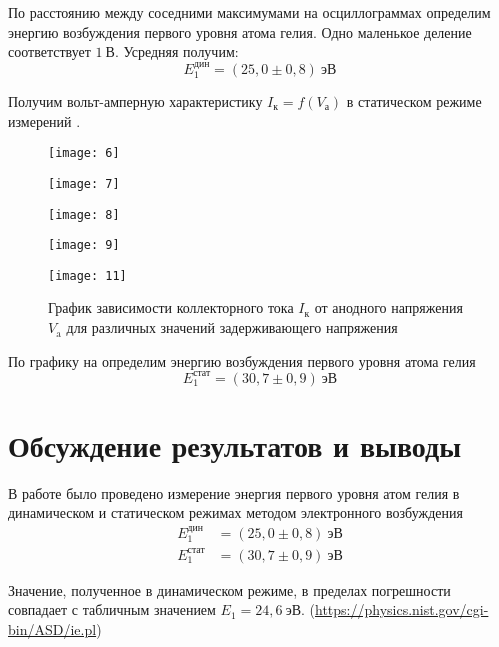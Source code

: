 \documentclass[a4paper, 12pt]{article}
\begin{document}
По расстоянию между соседними максимумами на осциллограммах определим
энергию возбуждения первого уровня атома гелия. Одно маленькое деление
соответствует $1\ \text{В}$. Усредняя получим:
\[
    E_1^\text{дин} = (25,0 \pm 0,8)\ \text{эВ}
\]

Получим вольт-амперную характеристику $I_\text{к} = f (V_\text{а})$ в
статическом режиме измерений .


\begin{figure}[H]
    \begin{floatrow}

        {
        \texttt{[image: 6]}
    }

        {
        \texttt{[image: 7]}
    }
    \end{floatrow}
\end{figure}


\begin{figure}[H]
    \begin{floatrow}

        {
        \texttt{[image: 8]}
    }

        {
        \texttt{[image: 9]}
    }
    \end{floatrow}
\end{figure}



\begin{figure}[H]
    \texttt{[image: 11]} 
    \caption{График зависимости коллекторного тока $I_\text{к}$ от анодного
    напряжения $V_\text{a}$ для различных значений задерживающего
напряжения}
\label{fig:11}
\end{figure}

По графику на  определим энергию возбуждения первого
уровня атома гелия
\[
    E_1^\text{стат} = (30,7 \pm 0,9)\ \text{эВ}
\]







\section{Обсуждение результатов и выводы}
В работе было проведено измерение энергия первого уровня атом гелия в
динамическом и статическом режимах методом электронного возбуждения
\begin{equation*}
    \begin{aligned}
        E_1^\text{дин} &= (25,0 \pm 0,8)\ \text{эВ}\\
        E_1^\text{стат} &= (30,7 \pm 0,9)\ \text{эВ}
    \end{aligned}
\end{equation*}

Значение, полученное в динамическом режиме, в пределах погрешности
совпадает с табличным значением $E_1 = 24,6\
\text{эВ}$. (\url{https://physics.nist.gov/cgi-bin/ASD/ie.pl})
\end{document}
